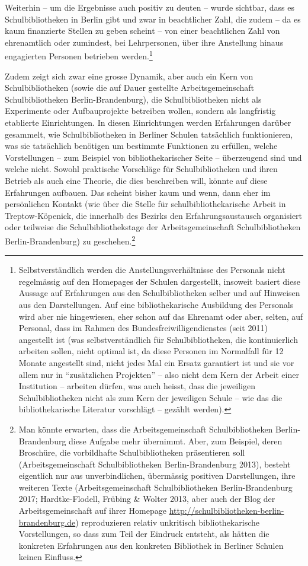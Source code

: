 \documentclass[a4paper,
fontsize=11pt,
oneside,
numbers=noperiodatend,
parskip=half-,
bibliography=totoc,
final
]{scrartcl}
\begin{document}
Weiterhin -- um die Ergebnisse auch positiv zu deuten -- wurde sichtbar,
dass es Schulbibliotheken in Berlin gibt und zwar in beachtlicher Zahl,
die zudem -- da es kaum finanzierte Stellen zu geben scheint -- von
einer beachtlichen Zahl von ehrenamtlich oder zumindest, bei
Lehrpersonen, über ihre Anstellung hinaus engagierten Personen betrieben
werden.\footnote{Selbstverständlich werden die Anstellungsverhältnisse
  des Personals nicht regelmässig auf den Homepages der Schulen
  dargestellt, insoweit basiert diese Aussage auf Erfahrungen aus den
  Schulbibliotheken selber und auf Hinweisen aus den Darstellungen. Auf
  eine bibliothekarische Ausbildung des Personals wird aber nie
  hingewiesen, eher schon auf das Ehrenamt oder aber, selten, auf
  Personal, dass im Rahmen des Bundesfreiwilligendienstes (seit 2011)
  angestellt ist (was selbstverständlich für Schulbibliotheken, die
  kontinuierlich arbeiten sollen, nicht optimal ist, da diese Personen
  im Normalfall für 12 Monate angestellt sind, nicht jedes Mal ein
  Ersatz garantiert ist und sie vor allem nur in \enquote{zusätzlichen
  Projekten} -- also nicht dem Kern der Arbeit einer Institution --
  arbeiten dürfen, was auch heisst, dass die jeweiligen
  Schulbibliotheken nicht als zum Kern der jeweiligen Schule -- wie das
  die bibliothekarische Literatur vorschlägt -- gezählt werden).}

Zudem zeigt sich zwar eine grosse Dynamik, aber auch ein Kern von
Schulbibliotheken (sowie die auf Dauer gestellte Arbeitsgemeinschaft
Schulbibliotheken Berlin-Brandenburg), die Schulbibliotheken nicht als
Experimente oder Aufbauprojekte betreiben wollen, sondern als
langfristig etablierte Einrichtungen. In diesen Einrichtungen werden
Erfahrungen darüber gesammelt, wie Schulbibliotheken in Berliner Schulen
tatsächlich funktionieren, was sie tatsächlich benötigen um bestimmte
Funktionen zu erfüllen, welche Vorstellungen -- zum Beispiel von
bibliothekarischer Seite -- überzeugend sind und welche nicht. Sowohl
praktische Vorschläge für Schulbibliotheken und ihren Betrieb als auch
eine Theorie, die dies beschreiben will, könnte auf diese Erfahrungen
aufbauen. Das scheint bisher kaum und wenn, dann eher im persönlichen
Kontakt (wie über die Stelle für schulbibliothekarische Arbeit in
Treptow-Köpenick, die innerhalb des Bezirks den Erfahrungsaustausch
organisiert oder teilweise die Schulbibliothekstage der
Arbeitsgemeinschaft Schulbibliotheken Berlin-Brandenburg) zu
geschehen.\footnote{Man könnte erwarten, dass die Arbeitsgemeinschaft
  Schulbibliotheken Berlin-Brandenburg diese Aufgabe mehr übernimmt.
  Aber, zum Beispiel, deren Broschüre, die vorbildhafte
  Schulbibliotheken präsentieren soll (Arbeitsgemeinschaft
  Schulbibliotheken Berlin-Brandenburg 2013), besteht eigentlich nur aus
  unverbindlichen, übermässig positiven Darstellungen, ihre weiteren
  Texte (Arbeitsgemeinschaft Schulbibliotheken Berlin-Brandenburg 2017;
  Hardtke-Flodell, Frübing \& Wolter 2013, aber auch der Blog der
  Arbeitsgemeinschaft auf ihrer Homepage
  \url{http://schulbibliotheken-berlin-brandenburg.de}) reproduzieren
  relativ unkritisch bibliothekarische Vorstellungen, so dass zum Teil
  der Eindruck entsteht, als hätten die konkreten Erfahrungen aus den
  konkreten Bibliothek in Berliner Schulen keinen Einfluss.}
\end{document}
